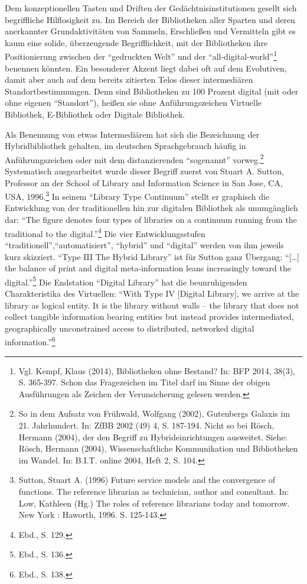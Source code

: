 \documentclass[a4paper,
fontsize=11pt,
oneside,
numbers=noperiodatend,
parskip=half-,
bibliography=totoc,
final
]{scrartcl}
\begin{document}
Dem konzeptionellen Tasten und Driften der Gedächtnisinstitutionen
gesellt sich begriffliche Hilflosigkeit zu. Im Bereich der Bibliotheken
aller Sparten und deren anerkannter Grundaktivitäten von Sammeln,
Erschließen und Vermitteln gibt es kaum eine solide, überzeugende
Begrifflichkeit, mit der Bibliotheken ihre Positionierung zwischen der
\enquote{gedruckten Welt} und der \enquote{all-digital-world}\footnote{Vgl.
  Kempf, Klaus (2014), Bibliotheken ohne Bestand? In: BFP 2014, 38(3),
  S. 365-397. Schon das Fragezeichen im Titel darf im Sinne der obigen
  Ausführungen als Zeichen der Verunsicherung gelesen werden.} benennen
könnten. Ein besonderer Akzent liegt dabei oft auf dem Evolutiven, damit
aber auch auf dem bereits zitierten Telos dieser intermediären
Standortbestimmungen. Denn sind Bibliotheken zu 100 Prozent digital (mit
oder ohne eigenen \enquote{Standort}), heißen sie ohne Anführungszeichen
Virtuelle Bibliothek, E-Bibliothek oder Digitale Bibliothek.

Als Benennung von etwas Intermediärem hat sich die Bezeichnung der
Hybridbibliothek gehalten, im deutschen Sprachgebrauch häufig in
Anführungszeichen oder mit dem distanzierenden \enquote{sogenannt}
vorweg.\footnote{So in dem Aufsatz von Frühwald, Wolfgang (2002),
  Gutenbergs Galaxis im 21. Jahrhundert. In: ZfBB 2002 (49) 4, S.
  187-194. Nicht so bei Rösch, Hermann (2004), der den Begriff zu
  Hybrideinrichtungen ausweitet. Siehe: Rösch, Hermann (2004),
  Wissenschaftliche Kommunikation und Bibliotheken im Wandel. In: B.I.T.
  online 2004, Heft 2, S. 104.} Systematisch ausgearbeitet wurde dieser
Begriff zuerst von Stuart A. Sutton, Professor an der School of Library
and Information Science in San Jose, CA, USA, 1996.\footnote{Sutton,
  Stuart A. (1996) Future service models and the convergence of
  functions. The reference librarian as technician, author and
  consultant. In: Low, Kathleen (Hg.) The roles of reference librarians
  today and tomorrow. New York : Haworth, 1996. S. 125-143.} In seinem
\enquote{Library Type Continuum} stellt er graphisch die Entwicklung von
der traditionellen hin zur digitalen Bibliothek als unumgänglich dar:
\enquote{The figure denotes four types of libraries on a continuum
running from the traditional to the digital.}\footnote{Ebd., S. 129.}
Die vier Entwicklungsstufen
\enquote{traditionell},\enquote{automatisiert}, \enquote{hybrid} und
\enquote{digital} werden von ihm jeweils kurz skizziert. \enquote{Type
III The Hybrid Library} ist für Sutton ganz Übergang:
\enquote{{[}\ldots{}{]} the balance of print and digital
meta-information leans increasingly toward the digital.}\footnote{Ebd.,
  S. 136.} Die Endstation \enquote{Digital Library} hat die
beunruhigenden Charakteristika des Virtuellen: \enquote{With Type IV
{[}Digital Library{]}, we arrive at the library as logical entity. It is
the library without walls -- the library that does not collect tangible
information bearing entities but instead provides intermediated,
geographically unconstrained access to distributed, networked digital
information.}\footnote{Ebd., S. 138.}
\end{document}
